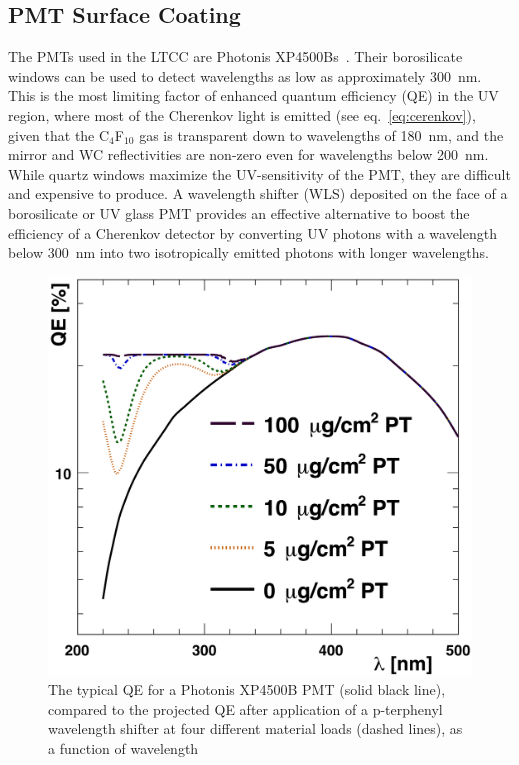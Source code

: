 \subsection{PMT Surface Coating}

The PMTs used in the LTCC are Photonis XP4500Bs~\cite{Photonis:2007ta}. Their borosilicate windows can be used to
detect wavelengths as low as approximately 300~nm. This is the most limiting factor of enhanced quantum efficiency
(QE) in the UV region, where most of the Cherenkov light is emitted (see eq.~\ref{eq:cerenkov}), given that the
C$_4$F$_{10}$ gas is transparent down to wavelengths of 180~nm, and the mirror and WC reflectivities are non-zero
even for wavelengths below 200~nm. While quartz windows maximize the UV-sensitivity of the PMT, they are difficult
and expensive to produce. A wavelength shifter (WLS) deposited on the face of a borosilicate or UV glass PMT provides
an effective alternative to boost the efficiency of a Cherenkov detector by converting UV photons with a wavelength
below 300~nm into two isotropically emitted photons with longer wavelengths.


\begin{figure}[H]
	\centering
	\includegraphics[width=0.99\columnwidth, height=0.75\columnwidth]{img/pmtQuantumEfficiencyGain.png}
	\caption{The typical QE for a Photonis XP4500B PMT (solid black line), compared to the projected QE after
          application of a p-terphenyl wavelength shifter at four different material loads (dashed lines), as a function
          of wavelength}
	\label{fig:pmtQuantumEfficiencyGainAndExample}
\end{figure}

